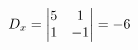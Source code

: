 \documentclass[preview]{standalone}
\begin{document}
\begin{align*}
\special{dvisvgm:raw <g id='unique000'>}D_x=\begin{vmatrix} 5 & 1 \\ 1 & -1 \end{vmatrix}=-6\special{dvisvgm:raw </g>}
\end{align*}
\end{document}
